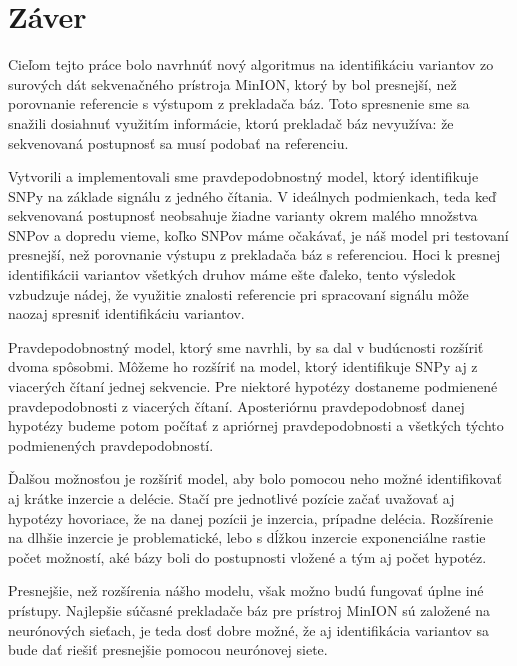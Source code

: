 \chapter*{Záver}  %

Cieľom tejto práce bolo navrhnúť nový algoritmus na identifikáciu variantov zo surových dát sekvenačného
prístroja MinION, ktorý by bol presnejší, než porovnanie
referencie s výstupom z prekladača báz. Toto spresnenie sme sa snažili dosiahnuť využitím informácie,
ktorú prekladač báz nevyužíva: že sekvenovaná postupnosť sa musí podobať na referenciu.

Vytvorili a implementovali sme pravdepodobnostný model, ktorý identifikuje SNPy na základe signálu z jedného čítania.
V ideálnych podmienkach, teda keď sekvenovaná postupnosť neobsahuje žiadne varianty okrem malého množstva SNPov a dopredu vieme, koľko SNPov máme očakávať, je náš model pri testovaní presnejší,
než porovnanie výstupu z prekladača báz s referenciou.  Hoci k presnej identifikácii variantov všetkých druhov
máme ešte ďaleko, tento výsledok vzbudzuje nádej, že využitie znalosti referencie pri spracovaní signálu
môže naozaj spresniť identifikáciu variantov.

Pravdepodobnostný model, ktorý sme navrhli, by sa dal v budúcnosti rozšíriť dvoma spôsobmi.
Môžeme ho rozšíriť na model, ktorý identifikuje SNPy aj z viacerých čítaní jednej sekvencie.
Pre niektoré hypotézy dostaneme podmienené pravdepodobnosti z viacerých čítaní. Aposteriórnu
pravdepodobnosť danej hypotézy budeme potom počítať z apriórnej pravdepodobnosti a všetkých týchto
podmienených pravdepodobností.

Ďalšou možnosťou je rozšíriť model, aby bolo pomocou neho možné identifikovať aj krátke inzercie
a delécie. Stačí pre jednotlivé pozície začať uvažovať aj hypotézy hovoriace, že na danej pozícii je inzercia,
prípadne delécia. Rozšírenie na dlhšie inzercie je problematické, lebo s dĺžkou inzercie exponenciálne rastie
počet možností, aké bázy boli do postupnosti vložené a tým aj počet hypotéz.

Presnejšie, než rozšírenia nášho modelu, však možno budú fungovať úplne iné prístupy.
Najlepšie súčasné prekladače báz pre prístroj MinION sú založené na neurónových sieťach, je teda dosť dobre možné,
že aj identifikácia variantov sa bude dať riešiť presnejšie pomocou neurónovej siete.